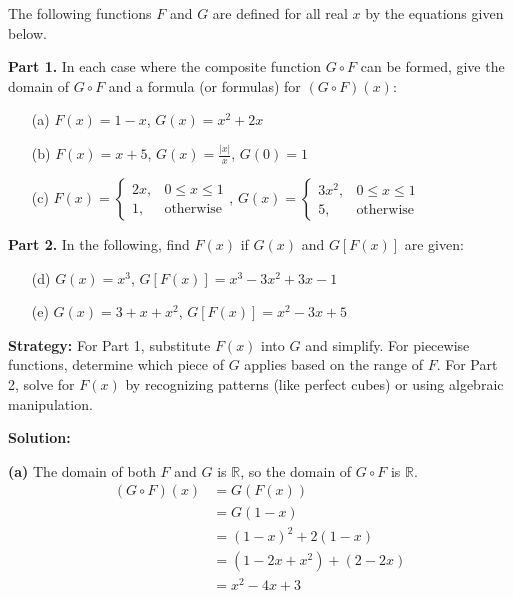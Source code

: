 \begin{problembox}
The following functions \( F \) and \( G \) are defined for all real \( x \) by the equations given below. 

\textbf{Part 1.} In each case where the composite function \( G \circ F \) can be formed, give the domain of \( G \circ F \) and a formula (or formulas) for \( (G \circ F)(x) \):
\begin{itemize}
\item[(a)] \( F(x) = 1 - x \), \quad \( G(x) = x^2 + 2x \)
\item[(b)] \( F(x) = x + 5 \), \quad \( G(x) = \frac{|x|}{x} \), \( G(0) = 1 \)
\item[(c)] \( F(x) = \begin{cases} 2x, & 0 \le x \le 1 \\ 1, & \text{otherwise} \end{cases} \),  
\( G(x) = \begin{cases} 3x^2, & 0 \le x \le 1 \\ 5, & \text{otherwise} \end{cases} \)
\end{itemize}
\textbf{Part 2.} In the following, find \( F(x) \) if \( G(x) \) and \( G[F(x)] \) are given:
\begin{itemize}
\item[(d)] \( G(x) = x^3 \), \quad \( G[F(x)] = x^3 - 3x^2 + 3x - 1 \)
\item[(e)] \( G(x) = 3 + x + x^2 \), \quad \( G[F(x)] = x^2 - 3x + 5 \)
\end{itemize}
\end{problembox}

\noindent\textbf{Strategy:} For Part 1, substitute $F(x)$ into $G$ and simplify. For piecewise functions, determine which piece of $G$ applies based on the range of $F$. For Part 2, solve for $F(x)$ by recognizing patterns (like perfect cubes) or using algebraic manipulation.

\bigskip\noindent\textbf{Solution:}

\textbf{(a)}
The domain of both \(F\) and \(G\) is \(\mathbb{R}\), so the domain of \(G \circ F\) is \(\mathbb{R}\).
\begin{align*}
(G \circ F)(x) &= G(F(x)) \\
&= G(1-x) \\
&= (1-x)^2 + 2(1-x) \\
&= (1 - 2x + x^2) + (2 - 2x) \\
&= x^2 - 4x + 3
\end{align*}

